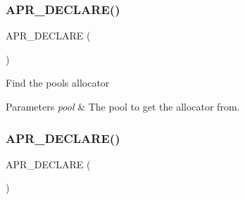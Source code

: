 \subsubsection{\texorpdfstring{A\+P\+R\+\_\+\+D\+E\+C\+L\+A\+R\+E()}{APR\_DECLARE()}\hspace{0.1cm}{\footnotesize\ttfamily [3/6]}}
{\footnotesize\ttfamily A\+P\+R\+\_\+\+D\+E\+C\+L\+A\+RE (\begin{DoxyParamCaption}\item[{\mbox{\hyperlink{group__apr__allocator_ga1ceabfd30fcfc455e47d052d2a24244b}{apr\+\_\+allocator\+\_\+t}} $\ast$}]{ }\end{DoxyParamCaption})}

Find the pool\textquotesingle{}s allocator 
\begin{DoxyParams}{Parameters}
{\em pool} & The pool to get the allocator from. \\
\hline
\end{DoxyParams}
\mbox{\label{group__apr__pools_ga7cb63e2c63fd7769ce05b8bd5d82b833}} 
\subsubsection{\texorpdfstring{A\+P\+R\+\_\+\+D\+E\+C\+L\+A\+R\+E()}{APR\_DECLARE()}\hspace{0.1cm}{\footnotesize\ttfamily [4/6]}}
{\footnotesize\ttfamily A\+P\+R\+\_\+\+D\+E\+C\+L\+A\+RE (\begin{DoxyParamCaption}\item[{void $\ast$}]{ }\end{DoxyParamCaption})}

